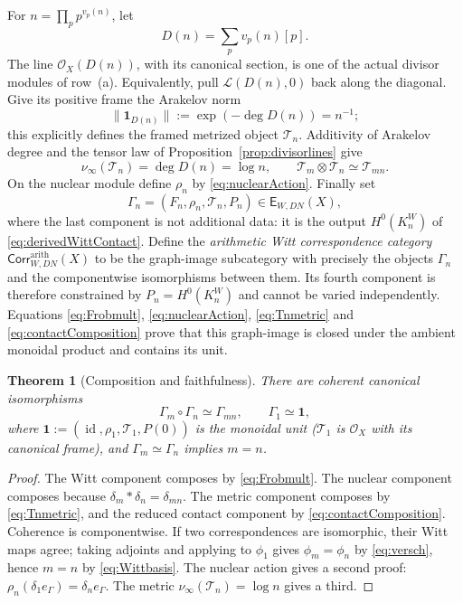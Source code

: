 \documentclass[11pt]{amsart}
\newtheorem{theorem}{Theorem}[section]
\theoremstyle{definition}
\theoremstyle{remark}
\begin{document}
For $n=\prod_pp^{v_p(n)}$, let
\[
 D(n)=\sum_pv_p(n)[p].
\]
The line $\mathcal O_X(D(n))$, with its canonical section, is one of the
actual divisor modules of row~(a).  Equivalently, pull
$\mathcal L(D(n),0)$ back along the diagonal.  Give its positive frame the
Arakelov norm
\[
 \|\mathbf1_{D(n)}\|:=\exp(-\deg D(n))=n^{-1};
\]
this explicitly defines the framed metrized object $\mathcal T_n$.
Additivity of Arakelov degree and the tensor law of
Proposition~\ref{prop:divisorlines} give
\begin{equation}\label{eq:Tnmetric}
 \nu_\infty(\mathcal T_n)=\deg D(n)=\log n,\qquad
 \mathcal T_m\otimes\mathcal T_n\simeq\mathcal T_{mn}.
\end{equation}
On the nuclear module define $\rho_n$ by
\eqref{eq:nuclearAction}.  Finally set
\begin{equation}\label{eq:Gamman}
 \Gamma_n=(F_n,\rho_n,\mathcal T_n,P_n)
 \in\mathsf E_{W,DN}(X),
\end{equation}
where the last component is not additional data: it is the output
$H^0(K_n^W)$ of \eqref{eq:derivedWittContact}.
Define the \emph{arithmetic Witt correspondence category}
$\mathsf{Corr}_{W,DN}^{\mathrm{arith}}(X)$ to be the graph-image
subcategory with precisely the objects $\Gamma_n$ and the componentwise
isomorphisms between them.  Its fourth component is therefore constrained
by $P_n=H^0(K_n^W)$ and cannot be varied independently.  Equations
\eqref{eq:Frobmult}, \eqref{eq:nuclearAction}, \eqref{eq:Tnmetric} and
\eqref{eq:contactComposition} prove that this graph-image is closed under
the ambient monoidal product and contains its unit.

\begin{theorem}[Composition and faithfulness]\label{thm:rowbcompose}
There are coherent canonical isomorphisms
\[
 \Gamma_m\circ\Gamma_n\simeq\Gamma_{mn},\qquad
 \Gamma_1\simeq\mathbf 1,
\]
where $\mathbf 1:=(\operatorname{id},\rho_1,\mathcal T_1,P(0))$ is the
monoidal unit ($\mathcal T_1$ is $\mathcal O_X$ with its canonical frame),
and $\Gamma_m\simeq\Gamma_n$ implies $m=n$.
\end{theorem}

\begin{proof}
The Witt component composes by \eqref{eq:Frobmult}.  The nuclear component
composes because $\delta_m*\delta_n=\delta_{mn}$.  The metric component
composes by \eqref{eq:Tnmetric}, and the reduced contact component by
\eqref{eq:contactComposition}.  Coherence is componentwise.  If two
correspondences are isomorphic, their Witt maps agree; taking adjoints and
applying to $\phi_1$ gives $\phi_m=\phi_n$ by \eqref{eq:versch}, hence
$m=n$ by \eqref{eq:Wittbasis}.  The nuclear action gives a second proof:
$\rho_n(\delta_1e_\Gamma)=\delta_ne_\Gamma$.  The metric
$\nu_\infty(\mathcal T_n)=\log n$ gives a third.
\end{proof}
\end{document}
